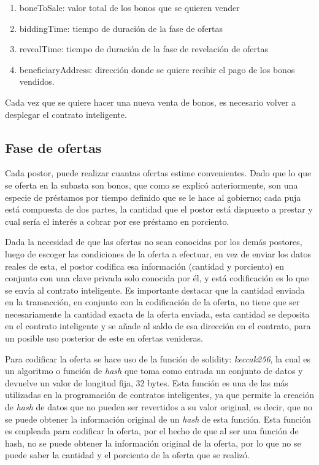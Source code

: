       \begin{enumerate}
        \item boneToSale: valor total de los bonos que se quieren vender
        \item biddingTime: tiempo de duración de la fase de ofertas
        \item revealTime: tiempo de duración de la fase de revelación de ofertas
        \item beneficiaryAddress: dirección donde se quiere recibir el pago de los bonos vendidos.
      \end{enumerate}

      Cada vez que se quiere hacer una nueva venta de bonos, es necesario volver a desplegar el contrato inteligente.

    \subsection{Fase de ofertas}
      Cada postor, puede realizar cuantas ofertas estime convenientes. Dado que lo que se oferta en la subasta son 
      bonos, que como se explicó anteriormente, son una especie de préstamos por tiempo definido que se le hace al gobierno; cada puja está
      compuesta de dos partes, la cantidad que el postor está dispuesto a prestar y cual sería el interés a cobrar por ese préstamo en 
      porciento. 

      Dada la necesidad de que las ofertas no sean conocidas por los demás postores, luego de escoger las condiciones de la oferta a 
      efectuar, 
      en vez de enviar los datos reales de esta, el postor codifica esa información (cantidad y porciento) en conjunto con una clave
      privada solo conocida por él, y está codificación es lo que se envía al contrato inteligente. Es importante destacar que la cantidad
      enviada en la transacción, en conjunto con la codificación de la oferta, no tiene que ser necesariamente la cantidad exacta de la 
      oferta enviada, esta cantidad se deposita en el contrato inteligente y se añade al saldo de esa dirección en el contrato, para un 
      posible uso posterior de este en ofertas venideras.

      Para codificar la oferta se hace uso de la función de solidity: \textit{keccak256}, la cual es un algoritmo o función de 
      \textit{hash} que toma como entrada un conjunto de datos y devuelve un valor de longitud fija, 32 bytes. 
      Esta función es una de las más utilizadas en la programación de contratos inteligentes, ya que permite la creación de 
      \textit{hash} de datos que no pueden ser revertidos a su valor original, es decir, que no se puede obtener la información original
      de un \textit{hash} de esta función. Esta función es empleada para codificar la oferta, por el hecho de que al ser una función de hash,
      no se puede obtener la información original de la oferta, por lo que no se puede saber la cantidad y el porciento de la oferta
      que se realizó.

